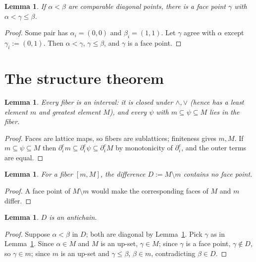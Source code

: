 \documentclass[11pt]{amsart}
\newtheorem{lem}[thm]{Lemma}
\theoremstyle{definition}
\newcommand{\bnd}{\partial}
\begin{document}
\begin{lem}
  \label{lem:between}
  If $\alpha < \beta$ are comparable diagonal points, there is a face
  point $\gamma$ with $\alpha < \gamma \le \beta$.
\end{lem}

\begin{proof}
  Some pair has $\alpha_i = (0,0)$ and $\beta_i = (1,1)$.  Let
  $\gamma$ agree with $\alpha$ except $\gamma_i := (0,1)$.  Then
  $\alpha < \gamma$, $\gamma \le \beta$, and $\gamma$ is a face
  point.
\end{proof}

\section{The structure theorem}
\label{sec:main}

\begin{lem}
  \label{lem:interval}
  Every fiber is an interval: it is closed under $\wedge, \vee$
  (hence has a least element $m$ and greatest element $M$), and every
  $\psi$ with $m \subseteq \psi \subseteq M$ lies in the fiber.
\end{lem}

\begin{proof}
  Faces are lattice maps, so fibers are sublattices; finiteness gives
  $m, M$.  If $m \subseteq \psi \subseteq M$ then
  $\bnd_i^e m \subseteq \bnd_i^e \psi \subseteq \bnd_i^e M$ by
  monotonicity of $\bnd_i^e$, and the outer terms are equal.
\end{proof}

\begin{lem}
  \label{lem:diagonal}
  For a fiber $[m, M]$, the difference $D := M \setminus m$ contains
  no face point.
\end{lem}

\begin{proof}
  A face point of $M \setminus m$ would make the corresponding faces
  of $M$ and $m$ differ.
\end{proof}

\begin{lem}
  \label{lem:antichain}
  $D$ is an antichain.
\end{lem}

\begin{proof}
  Suppose $\alpha < \beta$ in $D$; both are diagonal by
  Lemma~\ref{lem:diagonal}.  Pick $\gamma$ as in
  Lemma~\ref{lem:between}.  Since $\alpha \in M$ and $M$ is an
  up-set, $\gamma \in M$; since $\gamma$ is a face point,
  $\gamma \notin D$, so $\gamma \in m$; since $m$ is an up-set and
  $\gamma \le \beta$, $\beta \in m$, contradicting $\beta \in D$.
\end{proof}
\end{document}

